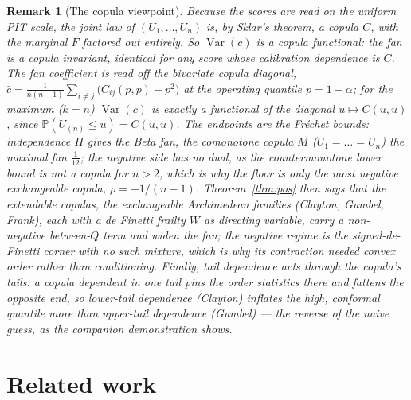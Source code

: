 \documentclass[11pt]{article}
\newtheorem{remark}{Remark}
\begin{document}
\begin{remark}[The copula viewpoint]\label{rmk:copula}
Because the scores are read on the uniform PIT scale, the joint law of $(U_1,\dots,U_n)$ is, by Sklar's
theorem, a copula $C$, with the marginal $F$ factored out entirely. So $\operatorname{Var}(c)$ is a
\emph{copula functional}: the fan is a copula invariant, identical for any score whose calibration
dependence is $C$. The fan coefficient is read off the bivariate copula diagonal,
$\bar c=\tfrac1{n(n-1)}\sum_{i\ne j}\big(C_{ij}(p,p)-p^2\big)$ at the operating quantile $p=1-\alpha$;
for the maximum ($k=n$) $\operatorname{Var}(c)$ is exactly a functional of the diagonal $u\mapsto
C(u,u)$, since $\mathbb P(U_{(n)}\le u)=C(u,u)$. The endpoints are the Fr\'echet bounds: independence
$\Pi$ gives the Beta fan, the comonotone copula $M$ ($U_1=\dots=U_n$) the maximal fan $\tfrac1{12}$;
the negative side has no dual, as the countermonotone lower bound is not a copula for $n>2$, which is
why the floor is only the most negative \emph{exchangeable} copula, $\rho=-1/(n-1)$.
Theorem~\ref{thm:pos} then says that the \emph{extendable} copulas, the exchangeable Archimedean
families (Clayton, Gumbel, Frank), each with a de Finetti frailty $W$ as directing variable, carry a
non-negative between-$Q$ term and widen the fan; the negative regime is the signed-de-Finetti corner
with no such mixture, which is why its contraction needed convex order rather than conditioning.
Finally, tail dependence acts through the copula's tails: a copula dependent in one tail pins the
order statistics there and fattens the opposite end, so lower-tail dependence (Clayton) inflates the
high, conformal quantile more than upper-tail dependence (Gumbel) --- the reverse of the naive guess,
as the companion demonstration shows.
\end{remark}

\section{Related work}
\end{document}
